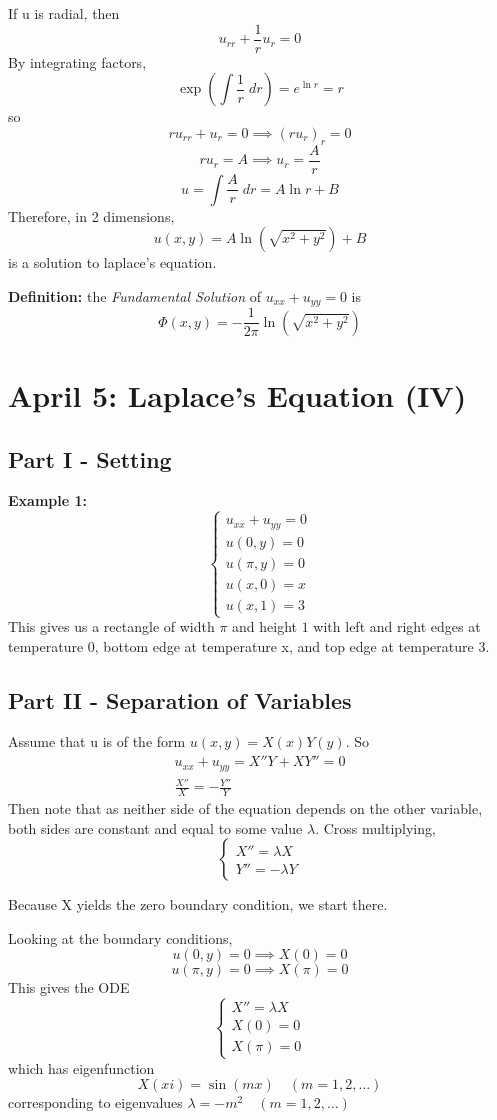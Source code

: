 \documentclass[12pt]{article}
\begin{document}
If u is radial, then 
\[u_{rr} + \frac{1}{r}u_r = 0\]
By integrating factors, 
\[\exp(\int \frac{1}{r}\; dr) = e^{\ln r} = r\]
so 
\[ru_{rr} + u_r = 0 \implies (ru_r)_r = 0\]
\[ru_r = A \implies u_r = \frac{A}{r}\]
\[u = \int \frac{A}{r} \; dr = A\ln r + B\]
Therefore, in 2 dimensions, 
\[\boxed{u(x, y) = A\ln(\sqrt{x^2 + y^2}) + B}\]
is a solution to laplace's equation.

\textbf{Definition:} the \emph{Fundamental Solution} of $u_{xx} + u_{yy} = 0$ is 
\[\boxed{\Phi(x, y) = -\frac{1}{2\pi} \ln(\sqrt{x^2 + y^2})}\]

\section{April 5: Laplace's Equation (IV)}
\subsection*{Part I - Setting}
\textbf{Example 1:} 
\[\begin{cases}
    u_{xx} + u_{yy} = 0\\
    u(0, y ) = 0\\
    u(\pi, y) = 0\\
    u(x, 0) = x\\
    u(x, 1) = 3
\end{cases}\]
This gives us a rectangle of width $\pi$ and height $1$ with left and right edges at temperature 0, bottom edge at temperature x, and top edge at temperature 3. 

\subsection*{Part II - Separation of Variables}
Assume that u is of the form $u(x, y) = X(x)Y(y)$. 
So 
\begin{gather*}
    u_{xx} + u_{yy} = X''Y + XY'' = 0\\
    \frac{X''}{X} = - \frac{Y''}{Y}
\end{gather*}
Then note that as neither side of the equation depends on the other variable, both sides are constant and equal to some value $\lambda$. Cross multiplying,
\[\begin{cases}
    X'' = \lambda X\\
    Y'' = -\lambda Y
\end{cases}\]

Because X yields the zero boundary condition, we start there. 

Looking at the boundary conditions, 
\[u(0, y) = 0 \implies X(0) = 0\]
\[u(\pi, y) = 0 \implies X(\pi) = 0\]
This gives the ODE 
\[\begin{cases}
    X'' = \lambda X\\
    X(0) = 0\\
    X(\pi) = 0
\end{cases}\]
which has eigenfunction 
\[X(xi) = \sin(mx) \quad (m = 1, 2, ...)\]
corresponding to eigenvalues $\lambda = -m^2 \quad (m=1, 2,...)$
\end{document}
